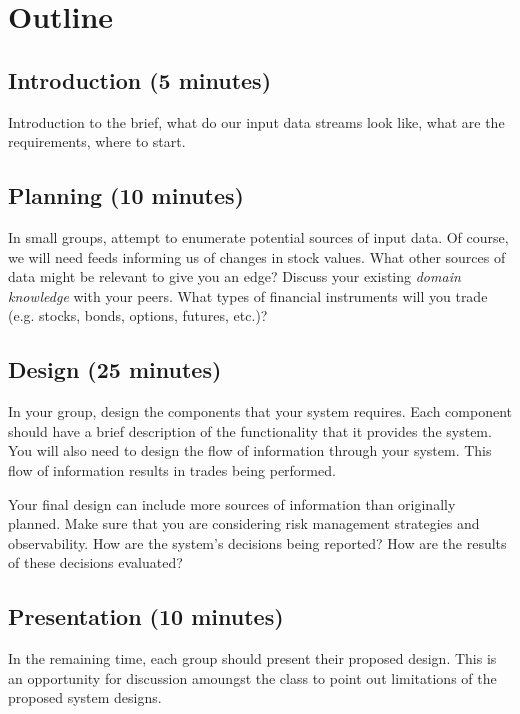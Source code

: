 \documentclass{csse4400}
\begin{document}
\section{Outline}

\subsection*{Introduction (5 minutes)}
Introduction to the brief,
what do our input data streams look like,
what are the requirements,
where to start.


\subsection*{Planning (10 minutes)}
In small groups,
attempt to enumerate potential sources of input data.
Of course,
we will need feeds informing us of changes in stock values.
What other sources of data might be relevant to give you an edge?
Discuss your existing \textsl{domain knowledge} with your peers.
What types of financial instruments will you trade (e.g. stocks, bonds, options, futures, etc.)?

\subsection*{Design (25 minutes)}

In your group,
design the components that your system requires.
Each component should have a brief description of the functionality that it provides the system.
You will also need to design the flow of information through your system.
This flow of information results in trades being performed.

Your final design can include more sources of information than originally planned.
Make sure that you are considering risk management strategies and observability.
How are the system's decisions being reported?
How are the results of these decisions evaluated?

\subsection*{Presentation (10 minutes)}

In the remaining time,
each group should present their proposed design.
This is an opportunity for discussion amoungst the class to point out limitations of the proposed system designs.
\end{document}

